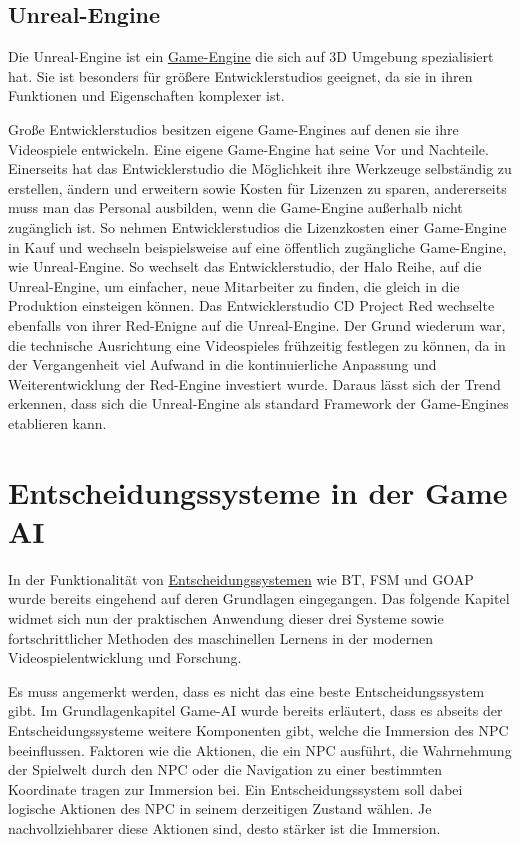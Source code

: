 \subsection{Unreal-Engine}
\label{chap:sota unreal-engine}

Die Unreal-Engine ist ein \hyperref[chap:game engines]{Game-Engine} die sich auf 3D Umgebung spezialisiert hat. Sie ist besonders f\"{u}r gr\"{o}\ss{}ere Entwicklerstudios geeignet, da sie in ihren Funktionen und Eigenschaften komplexer ist. 

Gro\ss{}e Entwicklerstudios besitzen eigene Game-Engines auf denen sie ihre Videospiele entwickeln. Eine eigene Game-Engine hat seine Vor und Nachteile. Einerseits hat das Entwicklerstudio die M\"{o}glichkeit ihre Werkzeuge selbst\"{a}ndig zu erstellen, \"{a}ndern und erweitern sowie Kosten f\"{u}r Lizenzen zu sparen, andererseits muss man das Personal ausbilden, wenn die Game-Engine au\ss{}erhalb nicht zug\"{a}nglich ist. So nehmen Entwicklerstudios die Lizenzkosten einer Game-Engine in Kauf und wechseln beispielsweise auf eine \"{o}ffentlich zug\"{a}ngliche Game-Engine, wie Unreal-Engine. So wechselt das Entwicklerstudio, der Halo Reihe, auf die Unreal-Engine, um einfacher, neue Mitarbeiter zu finden, die gleich in die Produktion einsteigen k\"{o}nnen.\autocite{golem6} Das Entwicklerstudio CD Project Red wechselte ebenfalls von ihrer Red-Enigne auf die Unreal-Engine. Der Grund wiederum war, die technische Ausrichtung eine Videospieles fr\"{u}hzeitig festlegen zu k\"{o}nnen, da in der Vergangenheit viel Aufwand in die kontinuierliche Anpassung und Weiterentwicklung der Red-Engine investiert wurde.\autocite{golem7} Daraus l\"{a}sst sich der Trend erkennen, dass sich die Unreal-Engine als standard Framework der Game-Engines etablieren kann.

\section{Entscheidungssysteme in der Game AI}
\label{chap:sota entscheidungssysteme}

In der Funktionalit\"{a}t von \hyperref[chap:entscheidungssysteme]{Entscheidungssystemen} wie BT, FSM und GOAP wurde bereits eingehend auf deren Grundlagen eingegangen. Das folgende Kapitel widmet sich nun der praktischen Anwendung dieser drei Systeme sowie fortschrittlicher Methoden des maschinellen Lernens in der modernen Videospielentwicklung und Forschung.

Es muss angemerkt werden, dass es nicht das eine beste Entscheidungssystem gibt. Im Grundlagenkapitel Game-AI wurde bereits erl\"{a}utert, dass es abseits der Entscheidungssysteme weitere Komponenten gibt, welche die Immersion des NPC beeinflussen. Faktoren wie die Aktionen, die ein NPC ausf\"{u}hrt, die Wahrnehmung der Spielwelt durch den NPC oder die Navigation zu einer bestimmten Koordinate tragen zur Immersion bei. Ein Entscheidungssystem soll dabei logische Aktionen des NPC in seinem derzeitigen Zustand w\"{a}hlen. Je nachvollziehbarer diese Aktionen sind, desto st\"{a}rker ist die Immersion.

